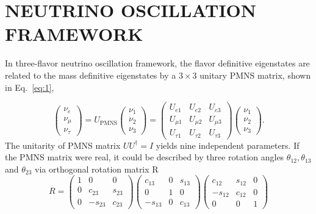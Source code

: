 \documentclass[a4 paper,12pt]{report}%
\def\Mr{\uppercase}
\begin{document}
 \section{\Mr{Neutrino oscillation framework}}\label{sec:oscframework}

In three-flavor neutrino oscillation framework, the flavor definitive eigenstates are related to the mass definitive eigenstates by a $3 \times 3$ unitary PMNS matrix, shown in Eq.~\ref{eq:1}, \par
\begin{equation}\label{eq:1}
\left(\begin{array}{ccc}\nu_e\\ \nu_\mu\\ \nu_\tau\end{array}\right)=U_{\text{PMNS}}\left(\begin{array}{ccc}\nu_1\\ \nu_2\\ \nu_3\end{array}\right)=\left(\begin{array}{ccc}U_{e1}& U_{e2} & U_{e3}\\U_{\mu 1} & U_{\mu 2} & U_{\mu 3}\\U_{\tau 1}& U_{\tau 2}& U_{\tau 3}\end{array}\right)\left(\begin{array}{ccc}\nu_1\\ \nu_2\\ \nu_3\end{array}\right).
\end{equation}
The unitarity of PMNS matrix $UU^{\dagger} = I$ yields nine independent parameters. If the PMNS matrix were real, it could be described by three rotation angles $\theta_{12}, \theta_{13}$ and $\theta_{23}$ via orthogonal rotation matrix R
 \begin{equation}\label{38}
 R= \left(\begin{array}{ccc} 1& 0 & 0 \\ 0 & c_{23} & s_{23}\\ 0& - s_{23}& c_{23}\end{array}\right) \left(\begin{array}{ccc} c_{13}& 0 & s_{13}\\ 0 & 1&0 \\-s_{13}& 0 & c_{13} \end{array}\right) \left(\begin{array}{ccc}c_{12} & s_{12} & 0\\ -s_{12} & c_{12} & 0\\ 0 & 0 & 1\end{array}\right)
\end{equation} 
\end{document}
